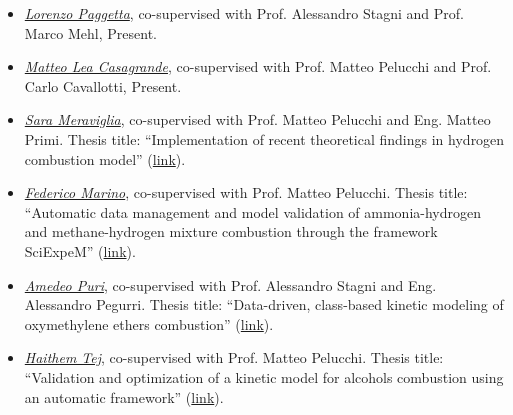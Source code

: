 
\begin{itemize}
   \item [ ] \ul{\it Lorenzo Paggetta}, co-supervised with Prof. Alessandro Stagni and
   Prof. Marco Mehl, Present.

   \item [ ] \ul{\it Matteo Lea Casagrande}, co-supervised with
      Prof. Matteo Pelucchi and Prof. Carlo Cavallotti, Present.

   \item [ ] \ul{\it Sara Meraviglia}, co-supervised with Prof. Matteo Pelucchi and Eng.
      Matteo Primi. Thesis title: ``Implementation of recent theoretical findings in
      hydrogen combustion model'' (\href{https://hdl.handle.net/10589/214934}{link}).

   \item [ ] \ul{\it Federico Marino}, co-supervised with Prof. Matteo Pelucchi. Thesis
      title: ``Automatic data management and model validation of ammonia-hydrogen and
      methane-hydrogen mixture combustion through the framework SciExpeM''
      (\href{https://hdl.handle.net/10589/212616}{link}).

   \item [ ] \ul{\it Amedeo Puri}, co-supervised with Prof. Alessandro Stagni and Eng.
      Alessandro Pegurri. Thesis title: ``Data-driven, class-based kinetic modeling of
      oxymethylene ethers combustion'' (\href{https://hdl.handle.net/10589/206686}{link}).

   \item [ ] \ul{\it Haithem Tej}, co-supervised with Prof. Matteo Pelucchi. Thesis title:
      ``Validation and optimization of a kinetic model for alcohols combustion using an
      automatic framework'' (\href{https://hdl.handle.net/10589/210401}{link}).

\end{itemize}
